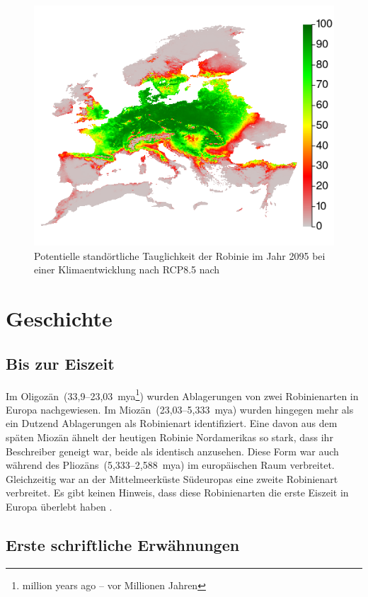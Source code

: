 \documentclass[twocolumn]{scrartcl}
\begin{document}
\begin{figure}[htbp]
  \centering
  \includegraphics[width=.9\linewidth]{./bild/potentialEuropaZukunft85}
  \caption{Potentielle standörtliche Tauglichkeit der Robinie im Jahr 2095 bei einer Klimaentwicklung nach RCP8.5 nach \cite{mauri2022baumartenZukunft}}
  \label{fig:verbreitungEuPotZukunft}
\end{figure}

\section{Geschichte}

\subsection{Bis zur Eiszeit}

Im Oligozän~(33,9--23,03~mya\footnote{million years ago -- vor Millionen
Jahren}) wurden Ablagerungen von zwei Robinienarten in Europa nachgewiesen. Im
Miozän~(23,03--5,333~mya) wurden hingegen mehr als ein Dutzend Ablagerungen als
Robinienart identifiziert. Eine davon aus dem späten Miozän ähnelt der heutigen
Robinie Nordamerikas so stark, dass ihr Beschreiber geneigt war, beide als
identisch anzusehen. Diese Form war auch während des Pliozäns~(5,333--2,588~mya)
im europäischen Raum verbreitet. Gleichzeitig war an der Mittelmeerküste
Südeuropas eine zweite Robinienart verbreitet. Es gibt keinen Hinweis, dass
diese Robinienarten die erste Eiszeit in Europa überlebt haben
\citep{berry1918robinie}.

\subsection{Erste schriftliche Erwähnungen}
\end{document}
